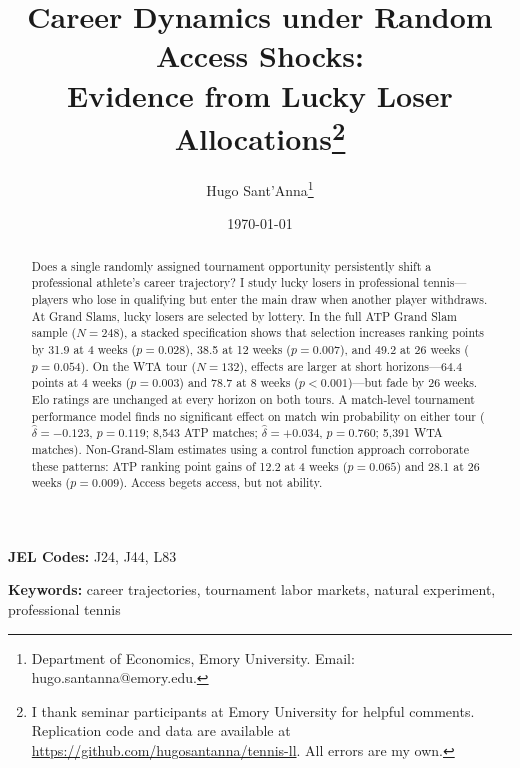 \documentclass[12pt]{article}
\title{Career Dynamics under Random Access Shocks:\\ Evidence from Lucky Loser Allocations\thanks{I thank seminar participants at Emory University for helpful comments. Replication code and data are available at \url{https://github.com/hugosantanna/tennis-ll}. All errors are my own.}}
\author{Hugo Sant'Anna\thanks{Department of Economics, Emory University. Email: hugo.santanna@emory.edu.}}
\date{\today}
\begin{document}
\maketitle
\thispagestyle{empty}

\begin{abstract}
\noindent \singlespacing
Does a single randomly assigned tournament opportunity persistently shift a professional athlete's career trajectory? I study lucky losers in professional tennis---players who lose in qualifying but enter the main draw when another player withdraws. At Grand Slams, lucky losers are selected by lottery. In the full ATP Grand Slam sample ($N = 248$), a stacked specification shows that selection increases ranking points by 31.9 at 4 weeks ($p = 0.028$), 38.5 at 12 weeks ($p = 0.007$), and 49.2 at 26 weeks ($p = 0.054$). On the WTA tour ($N = 132$), effects are larger at short horizons---64.4 points at 4 weeks ($p = 0.003$) and 78.7 at 8 weeks ($p < 0.001$)---but fade by 26 weeks. Elo ratings are unchanged at every horizon on both tours. A match-level tournament performance model finds no significant effect on match win probability on either tour ($\hat{\delta} = -0.123$, $p = 0.119$; 8,543 ATP matches; $\hat{\delta} = +0.034$, $p = 0.760$; 5,391 WTA matches). Non-Grand-Slam estimates using a control function approach corroborate these patterns: ATP ranking point gains of 12.2 at 4 weeks ($p = 0.065$) and 28.1 at 26 weeks ($p = 0.009$). Access begets access, but not ability.
\end{abstract}

\vspace{1em}
\noindent \textbf{JEL Codes:} J24, J44, L83

\vspace{0.5em}
\noindent \textbf{Keywords:} career trajectories, tournament labor markets, natural experiment, professional tennis

\newpage
\setcounter{page}{1}






\end{document}
